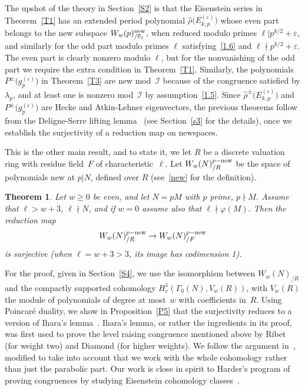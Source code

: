 \documentclass{amsart}
\theoremstyle{plain}
\newtheorem{thm}{Theorem}
\theoremstyle{definition}
\numberwithin{equation}{section}
\def\I{\mathcal{I}} \def\J{\mathcal{J}} \def\LL{\mathcal{L}}
\def\e{\varepsilon} \def\DD{\Delta} \def\G{\Gamma}\def\om{\omega}
\renewcommand{\wr}{\widehat{\rho}}
\def\vp{\varphi}
\def\rar{\rightarrow}\def\FF{\mathbb{F}}
\begin{document}
The upshot of the theory in Section~\ref{S2} is that the 
Eisenstein series in Theorem~\ref{T1} has an extended period polynomial 
$\wr\big(E_{k,p}^{(\e)}\big)$ whose even part belongs to the new subspace 
$W_w(p)_{/\FF_\ell}^\new$,
when reduced modulo primes $\ell|p^{k/2}+\e$, and similarly for the 
odd part modulo primes $\ell$ satisfying~\eqref{1.6} and  $\ell\nmid p^{k/2}+\e$. 
The even part is clearly nonzero modulo $\ell$, but for the 
nonvanishing of the odd part we require the extra condition in Theorem~\ref{T1}. 
Similarly, the polynomials $P^\pm\big(g_p^{(\e)}\big)$ in Theorem~\ref{T3} 
are new mod~$\I$ because of the congruence satisfied by $\lambda_p$, and at least one 
is nonzero mod~$\I$ by assumption~\eqref{1.5}. 
Since $\wr^\pm\big(E_{k,p}^{(\e)}\big)$ and  $P^\pm\big(g_p^{(\e)}\big)$ are Hecke and Atkin-Lehner
eigenvectors, the previous theorems follow from the Deligne-Serre 
lifting lemma~\cite{DeSe} (see Section~\ref{s3} for the details), once we establish the surjectivity 
of a reduction map on newspaces. 

This is the other main result, and to state it, we let $R$ be a discrete 
valuation ring with residue field~$F$ of characteristic~$\ell$.
Let  $W_{w}(N)^{p-\mathrm{new}}_{/R}$
be the space of polynomials new at $p|N$, defined over $R$ (see~\eqref{new} 
for the definition). 
\begin{thm} \label{T2} 
Let $w\ge 0$ be even, and let $N=pM$ with $p$ prime, $p\nmid M$.
Assume that $\ell> w+3$, $\ell\nmid N$, and if $w=0$ assume also that $\ell\nmid \vp(M)$.   
Then the reduction map
\[ W_{w}(N)^{p-\new}_{/R} \rar W_{w}(N)^{p-\new}_{/F} \]
is surjective (when $\ell=w+3>3$, its image has codimension 1). 
\end{thm}
For the proof, given in Section~\ref{S4}, we use the isomorphism between 
$W_{w}(N)_{/R}$ and the compactly supported cohomology
$H_c^1(\G_0(N), V_{w}(R))$, with $V_w(R)$ the module of polynomials  
of degree at most~$w$ with coefficients in~$R$. Using Poincar\'e duality,  
we show in Proposition~\ref{P5} that the surjectivity reduces to a version 
of Ihara's lemma~\cite[Lemma 3.2]{Ih}. Ihara's lemma, or rather the ingredients
in its proof, was first used to prove the level raising 
congruence mentioned above by Ribet (for weight two) and Diamond (for higher weights). 
We follow the argument in~\cite{Di}, modified to 
take into account that we work with the whole cohomology rather than just 
the parabolic part. Our work is close in spirit to Harder's program of 
proving congruences by studying Eisenstein cohomology classes~\cite{Ha}. 
\end{document}
